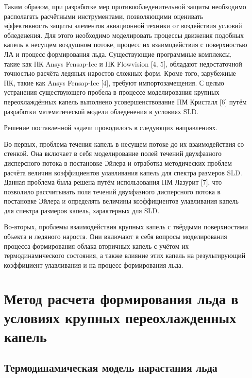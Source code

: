 \documentclass{psta}%
\begin{document}
Таким образом, при разработке мер противообледенительной защиты необходимо располагать расчётными инструментами, позволяющими оценивать эффективность защиты элементов авиационной техники от воздействия условий обледенения.
Для этого необходимо моделировать процессы движения подобных капель в несущем воздушном потоке, процесс их взаимодействия с поверхностью ЛА и процесс формирования льда.
Существующие программные комплексы, такие как ПК Ansys Fensap-Ice и ПК Flowvision [4, 5], обладают недостаточной точностью расчёта ледяных наростов сложных форм.
Кроме того, зарубежные ПК, такие как Ansys Fensap-Ice [4], требуют импортозамещения.
С целью устранения существующего пробела в процессе моделирования крупных переохлаждённых капель выполнено усовершенствование ПМ Кристалл [6] путём разработки математической модели обледенения в условиях SLD.

Решение поставленной задачи проводилось в следующих направлениях.

Во-первых, проблема течения капель в несущем потоке до их взаимодействия со стенкой.
Она включает в себя моделирование полей течений двухфазного дисперсного потока в постановке Эйлера и отработка методических проблем расчёта величин коэффициентов улавливания капель для спектра размеров SLD.
Данная проблема была решена путём использования ПМ Лазурит [7], что позволило рассчитывать поля течений двухфазного дисперсного потока в постановке Эйлера и определять величины коэффициентов улавливания капель для спектра размеров капель, характерных для SLD.

Во-вторых, проблемы взаимодействия крупных капель с твёрдыми поверхностями объекта и ледяного нароста.
Они включают в себя вопросы моделирования процесса формирования облака вторичных капель с учётом их термодинамического состояния, а также влияние этих капель на результирующий коэффициент улавливания и на процесс формирования льда.

\section{Метод расчета формирования льда в условиях крупных переохлажденных капель}

\subsection{Термодинамическая модель нарастания льда}
\end{document}
